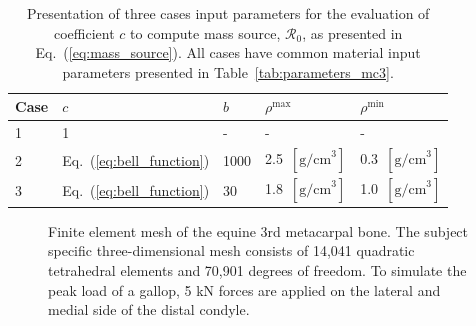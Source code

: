 \documentclass[11pt]{acmeArticle}
\numberwithin{equation}{section}
\begin{document}
\begin{table}[h]
	\centering
	\begin{tabular}{lllll}
		\hline
		Case                  & $c$              				       & $b$     &$\rho^\mathrm{max}$               &$\rho^\mathrm{min}$ \\ \hline
		1                     & 1              								 & -       & -                                & -\\
		2                     & Eq.~(\ref{eq:bell_function})   & 1000    & 2.5~$[{\text{g/cm}}^3]$          & 0.3~$[{\text{g/cm}}^3]$\\
		3                     & Eq.~(\ref{eq:bell_function})   & 30      & 1.8~$[{\text{g/cm}}^3]$          &1.0~$[{\text{g/cm}}^3]$ \\
		\hline
	\end{tabular} 
	\caption{Presentation of three cases input parameters for the evaluation of coefficient $c$ to compute mass source, $\mathcal{R}_0$, as presented in Eq.~(\ref{eq:mass_source}). All cases have common material input parameters presented in Table~\ref{tab:parameters_mc3}.}
	\label{tab:three_cases}
\end{table}

\begin{figure}[h]
	\begin{center}
		\caption{Finite element mesh of the equine 3rd metacarpal bone. The subject specific three-dimensional mesh consists of 14,041 quadratic tetrahedral elements and 70,901 degrees of freedom. To simulate the peak load of a gallop, 5 kN forces are applied on the lateral and medial side of the distal condyle.}
		\label{fig:mc3_BC}
	\end{center}
\end{figure}
\end{document}
